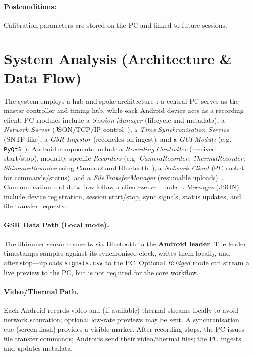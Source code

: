 \documentclass{report}
\begin{document}
    \paragraph{Postconditions:} Calibration parameters are stored on the PC and linked to future sessions.

    \section{System Analysis (Architecture \& Data Flow)}
    The system employs a hub-and-spoke architecture~\cite{azure_hub_spoke}: a central PC serves as the master controller and timing hub, while each Android device acts as a recording client. PC modules include a \textit{Session Manager} (lifecycle and metadata), a \textit{Network Server} (JSON/TCP/IP control~\cite{bray2017json}), a \textit{Time Synchronisation Service} (SNTP-like), a \textit{GSR Ingestor} (reconciles on ingest), and a \textit{GUI Module} (e.g. \texttt{PyQt5}~\cite{pyqt5}). Android components include a \textit{Recording Controller} (receives start/stop), modality-specific \textit{Recorders} (e.g. \textit{CameraRecorder}, \textit{ThermalRecorder}, \textit{ShimmerRecorder} using Camera2 and Bluetooth~\cite{android_camera2_api,bluetooth_spec}), a \textit{Network Client} (PC socket for commands/status), and a \textit{FileTransferManager} (resumable uploads)~\cite{junit5}. Communication and data flow follow a client–server model~\cite{clientserver_model_wiki}. Messages (JSON) include device registration, session start/stop, sync signals, status updates, and file transfer requests.

    \paragraph{GSR Data Path (Local mode).} The Shimmer sensor connects via Bluetooth to the \textbf{Android leader}. The leader timestamps samples against its synchronised clock, writes them locally, and—after stop—uploads \texttt{signals.csv} to the PC. Optional \emph{Bridged} mode can stream a live preview to the PC, but is not required for the core workflow.

    \paragraph{Video/Thermal Path.} Each Android records video and (if available) thermal streams locally to avoid network saturation; optional low-rate previews may be sent. A synchronisation cue (screen flash) provides a visible marker. After recording stops, the PC issues file transfer commands; Androids send their video/thermal files; the PC ingests and updates metadata.
\end{document}
